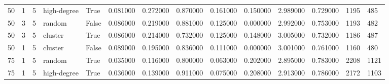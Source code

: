 \begin{table}
\begin{tabular}{llllllllllllll}
50 & 1 & 5 & high-degree & True & 0.081000 & 0.272000 & 0.870000 & 0.161000 & 0.150000 & 2.989000 & 0.729000 & 1195 & 485 \\
50 & 3 & 5 & random & False & 0.086000 & 0.219000 & 0.881000 & 0.125000 & 0.000000 & 2.992000 & 0.753000 & 1193 & 482 \\
50 & 3 & 5 & cluster & True & 0.086000 & 0.214000 & 0.732000 & 0.125000 & 0.148000 & 3.005000 & 0.732000 & 1186 & 487 \\
50 & 1 & 5 & cluster & False & 0.089000 & 0.195000 & 0.836000 & 0.111000 & 0.000000 & 3.001000 & 0.761000 & 1160 & 480 \\
75 & 1 & 5 & random & True & 0.035000 & 0.116000 & 0.800000 & 0.063000 & 0.202000 & 2.895000 & 0.783000 & 2208 & 1121 \\
75 & 1 & 5 & high-degree & True & 0.036000 & 0.139000 & 0.911000 & 0.075000 & 0.208000 & 2.913000 & 0.786000 & 2172 & 1103 \\
\bottomrule
\end{tabular}
\end{table}
